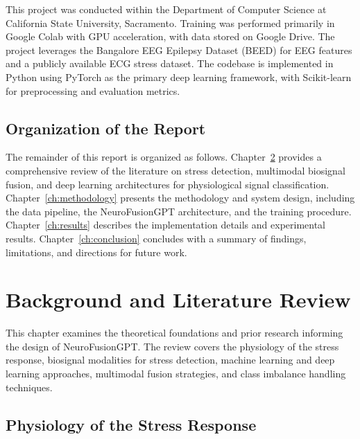 \documentclass[12pt,letterpaper]{report}
\begin{document}
This project was conducted within the Department of Computer Science at California State University, Sacramento. Training was performed primarily in Google Colab with GPU acceleration, with data stored on Google Drive. The project leverages the Bangalore EEG Epilepsy Dataset (BEED) for EEG features and a publicly available ECG stress dataset. The codebase is implemented in Python using PyTorch as the primary deep learning framework, with Scikit-learn for preprocessing and evaluation metrics.

\section{Organization of the Report}
\label{sec:organization}

The remainder of this report is organized as follows. Chapter~\ref{ch:background} provides a comprehensive review of the literature on stress detection, multimodal biosignal fusion, and deep learning architectures for physiological signal classification. Chapter~\ref{ch:methodology} presents the methodology and system design, including the data pipeline, the NeuroFusionGPT architecture, and the training procedure. Chapter~\ref{ch:results} describes the implementation details and experimental results. Chapter~\ref{ch:conclusion} concludes with a summary of findings, limitations, and directions for future work.


\clearpage
\chapter{Background and Literature Review}
\label{ch:background}

This chapter examines the theoretical foundations and prior research informing the design of NeuroFusionGPT. The review covers the physiology of the stress response, biosignal modalities for stress detection, machine learning and deep learning approaches, multimodal fusion strategies, and class imbalance handling techniques.

\section{Physiology of the Stress Response}
\label{sec:stress_physiology}
\end{document}
